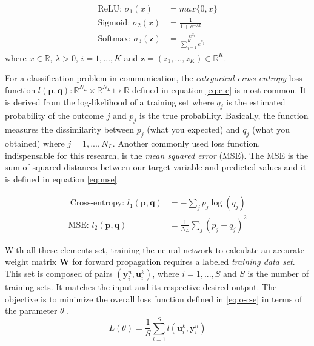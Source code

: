 \documentclass[conference]{IEEEtran}
\begin{document}
\begin{align}
	\text{ReLU: } \sigma_1 (x)& = max\{0, x\} \label{eq:relu}\\ 
	\text{Sigmoid: } \sigma_2 (x)& = \frac{1}{1+e^{- \lambda x}} \label{eq:sig}\\
	\text{Softmax: } \sigma_3 (\textbf{z})& = \frac{e^{z_i}}{\sum_{j=1}^{K}e^{z_j}}\label{eq:soft}
\end{align}
where $x \in \mathbb{R}$, $\lambda>0$, $i = 1,...,K$ and $\textbf{z} = (z_1,...,z_K) \in \mathbb{R}^K$.

For a classification problem in communication, the \textit{categorical cross-entropy} loss function $l(\textbf{p},\textbf{q}):\mathbb{R} ^{N_L}\times \mathbb{R} ^{N_L}\mapsto \mathbb{R}$ defined in equation \eqref{eq:c-e} is most common. It is derived from the log-likelihood of a training set where $q_j$ is the estimated probability of the outcome $j$ and $p_{j}$ is the true probability. Basically, the function measures the dissimilarity between $p_{j}$ (what you expected) and $q_{j}$ (what you obtained) \cite{murphy2013machine} where $j=1,...,N_L$. Another commonly used loss function, indispensable for this research, is the \textit{mean squared error} (MSE). The MSE is the  sum of squared distances between our target variable and predicted values and it is defined in equation \ref{eq:mse}. 

\begin{align}
\
	\text{Cross-entropy: }l_1(\textbf{p},\textbf{q}) &=-\sum _{j}p_{j}\log \left( q_{j}\right)\label{eq:c-e} \\
	\text{MSE: } l_2(\textbf{p},\textbf{q}) &=\frac{1}{N_L}\sum _{j}(p_{j}-q_{j})^{2} \label{eq:mse}
\end{align}

With all these elements set, training the neural network to calculate an accurate weight matrix $\textbf{W}$ for forward propagation requires a labeled \textit{training data set}. This set is composed of pairs $ (\textbf{y}_{i}^{n}, {\mathbf{u}}_i^k) $, where $i=1,...,S$ and $S$ is the number of training sets. It matches the input and its respective desired output. The objective is to minimize the overall loss function defined in \eqref{eq:o-c-e} in terms of the parameter $\theta$ \cite{DBLP:journals/corr/OSheaH17}. 
\begin{equation}\label{eq:o-c-e}
L\left( \theta \right) =\dfrac {1}{S}\sum ^{S}_{i=1}l\left({\mathbf{u}}_i^k  , \textbf{y}_{i}^{n}\right)	
\end{equation}  
\end{document}
